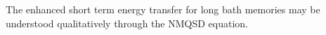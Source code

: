 The enhanced short term energy transfer for long bath memories may be
understood qualitatively through the NMQSD equation.%


